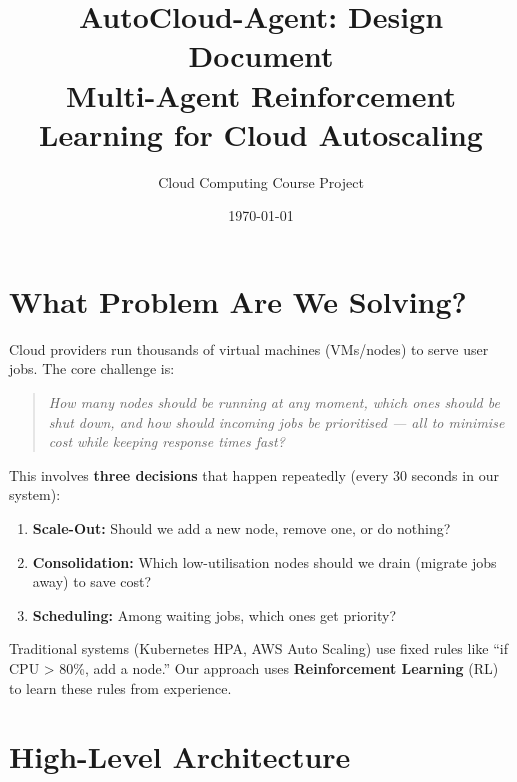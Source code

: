 \documentclass[11pt,a4paper]{article}
\title{\textbf{AutoCloud-Agent: Design Document}\\[6pt]
\large Multi-Agent Reinforcement Learning for Cloud Autoscaling}
\author{Cloud Computing Course Project}
\date{\today}
\begin{document}
\maketitle
\tableofcontents
\newpage


\section{What Problem Are We Solving?}


Cloud providers run thousands of virtual machines (VMs/nodes) to serve user jobs.
The core challenge is:

\begin{quote}
\textit{How many nodes should be running at any moment, which ones should be
shut down, and how should incoming jobs be prioritised --- all to minimise cost
while keeping response times fast?}
\end{quote}

This involves \textbf{three decisions} that happen repeatedly (every 30 seconds in our system):

\begin{enumerate}[leftmargin=2em]
  \item \textbf{Scale-Out:} Should we add a new node, remove one, or do nothing?
  \item \textbf{Consolidation:} Which low-utilisation nodes should we drain
        (migrate jobs away) to save cost?
  \item \textbf{Scheduling:} Among waiting jobs, which ones get priority?
\end{enumerate}

Traditional systems (Kubernetes HPA, AWS Auto Scaling) use fixed rules like
``if CPU > 80\%, add a node.'' Our approach uses \textbf{Reinforcement Learning}
(RL) to learn these rules from experience.


\section{High-Level Architecture}
\end{document}
